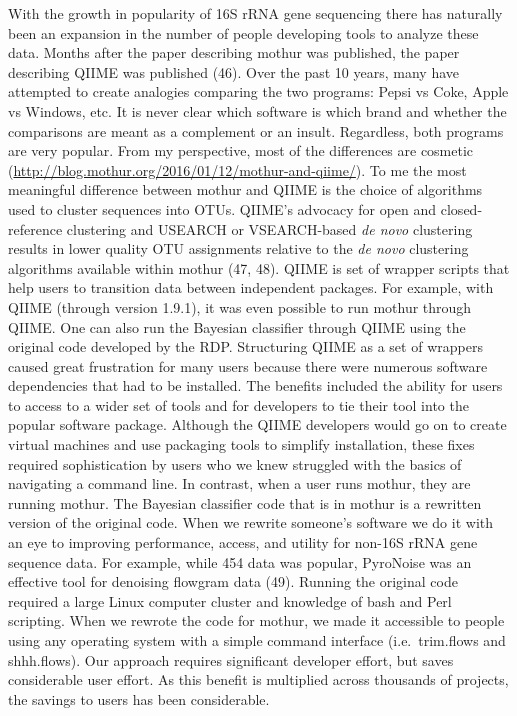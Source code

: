 \documentclass[11pt,]{article}
\begin{document}
With the growth in popularity of 16S rRNA gene sequencing there has
naturally been an expansion in the number of people developing tools to
analyze these data. Months after the paper describing mothur was
published, the paper describing QIIME was published (46). Over the past
10 years, many have attempted to create analogies comparing the two
programs: Pepsi vs Coke, Apple vs Windows, etc. It is never clear which
software is which brand and whether the comparisons are meant as a
complement or an insult. Regardless, both programs are very popular.
From my perspective, most of the differences are cosmetic
(\url{http://blog.mothur.org/2016/01/12/mothur-and-qiime/}). To me the
most meaningful difference between mothur and QIIME is the choice of
algorithms used to cluster sequences into OTUs. QIIME's advocacy for
open and closed-reference clustering and USEARCH or VSEARCH-based
\emph{de novo} clustering results in lower quality OTU assignments
relative to the \emph{de novo} clustering algorithms available within
mothur (47, 48). QIIME is set of wrapper scripts that help users to
transition data between independent packages. For example, with QIIME
(through version 1.9.1), it was even possible to run mothur through
QIIME. One can also run the  Bayesian classifier through
QIIME using the original code developed by the RDP. Structuring QIIME as
a set of wrappers caused great frustration for many users because there
were numerous software dependencies that had to be installed. The
benefits included the ability for users to access to a wider set of
tools and for developers to tie their tool into the popular software
package. Although the QIIME developers would go on to create virtual
machines and use packaging tools to simplify installation, these fixes
required sophistication by users who we knew struggled with the basics
of navigating a command line. In contrast, when a user runs mothur, they
are running mothur. The  Bayesian classifier code that is
in mothur is a rewritten version of the original code. When we rewrite
someone's software we do it with an eye to improving performance,
access, and utility for non-16S rRNA gene sequence data. For example,
while 454 data was popular, PyroNoise was an effective tool for
denoising flowgram data (49). Running the original code required a large
Linux computer cluster and knowledge of bash and Perl scripting. When we
rewrote the code for mothur, we made it accessible to people using any
operating system with a simple command interface (i.e.~trim.flows and
shhh.flows). Our approach requires significant developer effort, but
saves considerable user effort. As this benefit is multiplied across
thousands of projects, the savings to users has been considerable.
\end{document}
